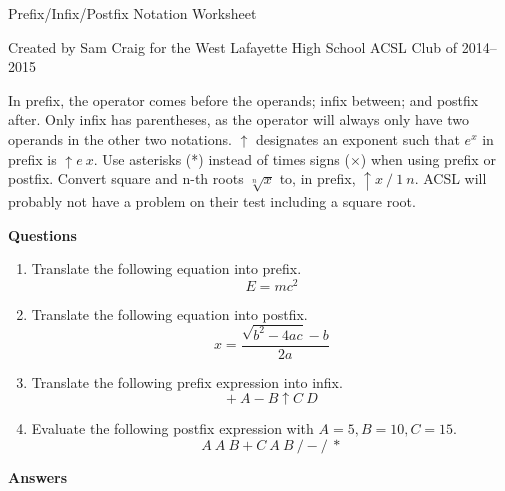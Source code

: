 \documentclass[12pt,letterpaper,fleqn]{article}
\begin{document}
\begin{center}
  Prefix/Infix/Postfix Notation Worksheet

  Created by Sam Craig for the West Lafayette High School ACSL Club of 2014--2015
\end{center}

In prefix, the operator comes before the operands; infix between; and postfix after.
Only infix has parentheses, as the operator will always only have two operands in the other two notations.
$\uparrow$ designates an exponent such that $e^x$ in prefix is $\uparrow e\ x$.
Use asterisks (*) instead of times signs ($\times$) when using prefix or postfix.
Convert square and n-th roots $\sqrt[n]{x}$ to, in prefix, $\uparrow x\ /\ 1\ n$.
ACSL will probably not have a problem on their test including a square root.

\bigskip
\noindent \textbf{Questions}

\begin{enumerate}

\item Translate the following equation into prefix.
  \[
  E = mc^2
  \]

\item Translate the following equation into postfix.
  \[
  x = \frac{\sqrt{b^2 - 4ac} - b}{2a}
  \]

\item Translate the following prefix expression into infix.
  \[
  +\ A - B \uparrow C\ D
  \]

\item Evaluate the following postfix expression with $A = 5, B = 10, C = 15$.
  \[
  A\ A\ B + C\ A\ B\ / - /\ *
  \]

\end{enumerate}

\pagebreak
\noindent \textbf{Answers}
\end{document}
